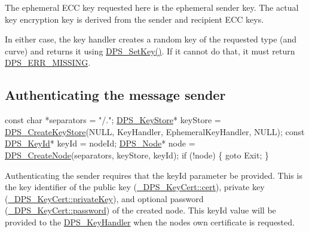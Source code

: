 The ephemeral E\+CC key requested here is the ephemeral sender key. The actual key encryption key is derived from the sender and recipient E\+CC keys.

In either case, the key handler creates a random key of the requested type (and curve) and returns it using \hyperlink{group__keystore_ga15d6a9b8256b67c2ec8b1d365a98dbab}{D\+P\+S\+\_\+\+Set\+Key()}. If it cannot do that, it must return \hyperlink{group__status_ga5c46980c33492a8b76bffce081dbcba4}{D\+P\+S\+\_\+\+E\+R\+R\+\_\+\+M\+I\+S\+S\+I\+NG}.\hypertarget{tutorials-security_authenticating-the-message-sender}{}\subsection{Authenticating the message sender}\label{tutorials-security_authenticating-the-message-sender}

\begin{DoxyCodeInclude}
    \textcolor{keyword}{const} \textcolor{keywordtype}{char} *separators = \textcolor{stringliteral}{"/."};
    \hyperlink{group__keystore_gaf3833cfe48f848f698514bc5daa075fa}{DPS\_KeyStore}* keyStore = \hyperlink{group__keystore_gafa79de23848ff56d0cced67897313369}{DPS\_CreateKeyStore}(NULL, KeyHandler, 
      EphemeralKeyHandler, NULL);
    \textcolor{keyword}{const} \hyperlink{struct___d_p_s___key_id}{DPS\_KeyId}* keyId = nodeId;
    \hyperlink{group__node_ga4dd612ab965134321bb57fdb065f121c}{DPS\_Node}* node = \hyperlink{group__node_gaf6641b5bbf27b2c45ac7f926b0ce4efe}{DPS\_CreateNode}(separators, keyStore, keyId);
    \textcolor{keywordflow}{if} (!node) \{
        \textcolor{keywordflow}{goto} Exit;
    \}
\end{DoxyCodeInclude}
Authenticating the sender requires that the {\ttfamily key\+Id} parameter be provided. This is the key identifier of the public key (\hyperlink{struct___d_p_s___key_cert_a2783654ef73f2cc58911f40cd6e4f6ba}{\+\_\+\+D\+P\+S\+\_\+\+Key\+Cert\+::cert}), private key (\hyperlink{struct___d_p_s___key_cert_a0ba1842f3982c930ba76469349b0812d}{\+\_\+\+D\+P\+S\+\_\+\+Key\+Cert\+::private\+Key}), and optional password (\hyperlink{struct___d_p_s___key_cert_a18f3f492b66fbeb3de6a09aff54369cf}{\+\_\+\+D\+P\+S\+\_\+\+Key\+Cert\+::password}) of the created node. This {\ttfamily key\+Id} value will be provided to the \hyperlink{group__keystore_gaccf7e3d43bc1e586132d7f1ae03d02f7}{D\+P\+S\+\_\+\+Key\+Handler} when the node\textquotesingle{}s own certificate is requested.



